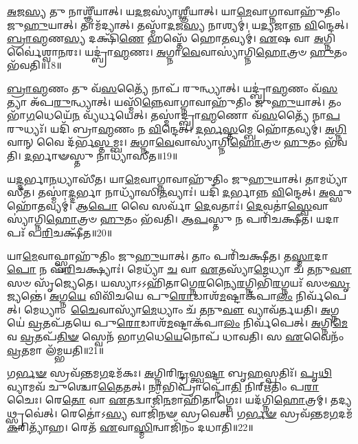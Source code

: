 \-\ul{𑌅}\-𑌜\-\ul{𑌸𑍍𑌯} 𑌤𑍁 𑌨𑌾𑌶𑍍𑌞𑍀᳴𑌯𑌾𑌤𑍍।
𑌯\-\ul{𑌦}\-𑌜𑌸𑍍𑌯𑌾॑\-\ul{𑌶𑍍𑌞𑍀}\-𑌯𑌾𑌤𑍍।
𑌯𑌾\-\ul{𑌮𑍇}\-𑌵𑌾𑌗𑍍𑌨𑌾𑌵𑌾𑌹𑍁᳴𑌤𑌿𑌂 𑌜𑍁\-\ul{𑌹𑍁}\-𑌯𑌾𑌤𑍍।
𑌤𑌾𑌮᳴𑌦𑍍𑌯𑌾𑌤𑍍।
𑌤𑌸𑍍𑌮𑌾᳴\-\ul{𑌦}\-𑌜\-\ul{𑌸𑍍𑌯} 𑌨𑌾𑌶𑍍𑌯𑌮𑍍॑।
𑌯\-\ul{𑌦𑍍𑌯}\-𑌜𑌾𑌨𑍍𑌨 \ul{𑌵𑌿}\-𑌨𑍍𑌦𑍇𑌤𑍍।
\-\ul{𑌬𑍍𑌰𑌾}\-\-\ul{𑌹𑍍𑌮}\-𑌣\-\ul{𑌸𑍍𑌯} 𑌦𑌕𑍍𑌷𑌿᳴\-\ul{𑌣𑍇} 𑌹𑌸𑍍𑌤𑍇᳴ 𑌹𑍋\-\ul{𑌤}\-𑌵𑍍𑌯𑌮𑍍॑।
\-\ul{𑌏}\-𑌷 𑌵𑌾 \ul{𑌅}\-𑌗𑍍𑌨𑌿𑌰𑍍𑌵𑍈॑𑌶𑍍𑌵𑌾\-\ul{𑌨}\-𑌰𑌃।
𑌯𑌦𑍍𑌬𑍍𑌰𑌾॑\-\ul{𑌹𑍍𑌮}\-𑌣𑌃।
\-\ul{𑌅}\-𑌗𑍍𑌨𑌾\-\ul{𑌵𑍇}\-𑌵𑌾𑌸𑍍𑌯𑌾॑𑌗𑍍𑌨𑌿\-\ul{𑌹𑍋}\-𑌤𑍍𑌰𑍞 \ul{𑌹𑍁}\-𑌤𑌂 𑌭᳴𑌵𑌤𑌿॥18॥

\-\ul{𑌬𑍍𑌰𑌾}\-\-\ul{𑌹𑍍𑌮}\-𑌣𑌂 𑌤𑍁 𑌵᳴\-\ul{𑌸}\-𑌤𑍍𑌯𑍈᳴ 𑌨𑌾𑌪᳴ 𑌰𑍁𑌨𑍍𑌧𑍍𑌯𑌾𑌤𑍍।
𑌯𑌦𑍍𑌬𑍍𑌰𑌾॑\-\ul{𑌹𑍍𑌮}\-𑌣𑌂 𑌵᳴\-\ul{𑌸}\-𑌤𑍍𑌯𑌾 𑌅᳴𑌪\-\ul{𑌰𑍁}\-𑌨𑍍𑌧𑍍𑌯𑌾𑌤𑍍।
𑌯𑌸𑍍𑌮𑌿᳴\-\ul{𑌨𑍍𑌨𑍇}\-𑌵𑌾𑌗𑍍𑌨𑌾𑌵𑌾𑌹𑍁᳴𑌤𑌿𑌂 𑌜𑍁\-\ul{𑌹𑍁}\-𑌯𑌾𑌤𑍍।
𑌤𑌂 𑌭𑌾᳴\-\ul{𑌗}\-𑌧𑍇𑌯𑍇᳴\-\ul{𑌨} 𑌵𑍍𑌯᳴𑌰𑍍𑌧𑌯𑍇𑌤𑍍।
𑌤𑌸𑍍𑌮𑌾॑𑌦𑍍𑌬𑍍𑌰𑌾\-\ul{𑌹𑍍𑌮}\-𑌣𑍋 𑌵᳴\-\ul{𑌸}\-𑌤𑍍𑌯𑍈᳴ 𑌨𑌾\-\ul{𑌪}\-𑌰𑍁𑌧𑍍𑌯𑌃᳴।
𑌯𑌦𑌿᳴ 𑌬𑍍𑌰𑌾\-\ul{𑌹𑍍𑌮}\-𑌣𑌂 𑌨 \ul{𑌵𑌿}\-𑌨𑍍𑌦𑍇𑌤𑍍।
\-\ul{𑌦}\-\-\ul{𑌰𑍍𑌭}\-\-\ul{𑌸𑍍𑌤}\-𑌮𑍍𑌬𑍇 𑌹𑍋᳴\-\ul{𑌤}\-𑌵𑍍𑌯𑌮𑍍॑।
\-\ul{𑌅}\-\-\ul{𑌗𑍍𑌨𑌿}\-𑌵𑌾𑌨𑍍 𑌵𑍈 𑌦᳴𑌰𑍍𑌭\-\ul{𑌸𑍍𑌤}\-𑌮𑍍𑌬𑌃।
\-\ul{𑌅}\-𑌗𑍍𑌨𑌾\-\ul{𑌵𑍇}\-𑌵𑌾𑌸𑍍𑌯𑌾॑𑌗𑍍𑌨𑌿\-\ul{𑌹𑍋}\-𑌤𑍍𑌰𑍞 \ul{𑌹𑍁}\-𑌤𑌂 𑌭᳴𑌵𑌤𑌿।
\-\ul{𑌦}\-𑌰𑍍𑌭𑌾𑍟𑌸𑍍𑌤𑍁 𑌨𑌾𑌧𑍍𑌯𑌾᳴𑌸𑍀𑌤॥19॥

𑌯\-\ul{𑌦𑍍𑌦}\-𑌰𑍍𑌭𑌾\-\ul{𑌨}\-𑌧𑍍𑌯𑌾𑌸𑍀᳴𑌤।
𑌯𑌾\-\ul{𑌮𑍇}\-𑌵𑌾𑌗𑍍𑌨𑌾𑌵𑌾𑌹𑍁᳴𑌤𑌿𑌂 𑌜𑍁\-\ul{𑌹𑍁}\-𑌯𑌾𑌤𑍍।
𑌤𑌾𑌮𑌧𑍍𑌯𑌾᳴𑌸𑍀𑌤।
𑌤𑌸𑍍𑌮𑌾॑\-\ul{𑌦𑍍𑌦}\-𑌰𑍍𑌭𑌾 𑌨𑌾𑌧𑍍𑌯𑌾᳴𑌸𑌿\-\ul{𑌤}\-𑌵𑍍𑌯𑌾𑌃॑।
𑌯𑌦𑌿᳴ \ul{𑌦}\-𑌰𑍍𑌭𑌾𑌨𑍍𑌨 \ul{𑌵𑌿}\-𑌨𑍍𑌦𑍇𑌤𑍍।
\-\ul{𑌅}\-𑌫𑍍𑌸𑍁 𑌹𑍋᳴\-\ul{𑌤}\-𑌵𑍍𑌯𑌮𑍍॑।
𑌆\-\ul{𑌪𑍋} 𑌵𑍈 𑌸𑌰𑍍𑌵𑌾᳴ \ul{𑌦𑍇}\-𑌵𑌤𑌾𑌃॑।
\-\ul{𑌦𑍇}\-𑌵𑌤𑌾॑\-\ul{𑌸𑍍𑌵𑍇}\-𑌵𑌾𑌸𑍍𑌯𑌾॑𑌗𑍍𑌨𑌿\-\ul{𑌹𑍋}\-𑌤𑍍𑌰𑍞 \ul{𑌹𑍁}\-𑌤𑌂 𑌭᳴𑌵𑌤𑌿।
𑌆\-\ul{𑌪}\-𑌸𑍍𑌤𑍁 𑌨 𑌪𑌰𑌿᳴𑌚𑌕𑍍𑌷𑍀𑌤।
𑌯𑌦𑌾𑌪𑌃᳴ 𑌪\-\ul{𑌰𑌿}\-𑌚𑌕𑍍𑌷𑍀᳴𑌤॥20॥

𑌯𑌾\-\ul{𑌮𑍇}\-𑌵𑌾𑌫𑍍𑌸𑍍𑌵𑌾𑌹𑍁᳴𑌤𑌿𑌂 𑌜𑍁\-\ul{𑌹𑍁}\-𑌯𑌾𑌤𑍍।
𑌤𑌾𑌂 𑌪𑌰𑌿᳴𑌚𑌕𑍍𑌷𑍀𑌤।
𑌤\-\ul{𑌸𑍍𑌮𑌾}\-𑌦𑌾\-\ul{𑌪𑍋} 𑌨 𑌪᳴\-\ul{𑌰𑌿}\-𑌚𑌕𑍍𑌷𑍍𑌯𑌾𑌃॑।
𑌮𑍇𑌧𑍍𑌯𑌾᳴ \ul{𑌚} 𑌵𑌾 \ul{𑌏}\-𑌤𑌸𑍍𑌯𑌾᳴\-\ul{𑌮𑍇}\-𑌧𑍍𑌯𑌾 𑌚᳴ \ul{𑌤}\-𑌨𑍁\-\ul{𑌵𑍗} 𑌸𑍞 𑌸𑍃᳴𑌜𑍍𑌯𑍇𑌤𑍇।
𑌯𑌸𑍍𑌯𑌾𑌽𑌽𑌹𑌿᳴𑌤𑌾𑌗𑍍𑌨𑍇\-\ul{𑌰}\-𑌨𑍍𑌯𑍈\-\ul{𑌰}\-𑌗𑍍𑌨𑌿𑌭𑌿᳴\-\ul{𑌰}\-𑌗𑍍𑌨𑌯𑌃᳴ 𑌸𑍞\-\ul{𑌸𑍃}\-𑌜𑍍𑌯𑌨𑍍𑌤𑍇॑।
\-\ul{𑌅}\-𑌗𑍍𑌨\-\ul{𑌯𑍇} 𑌵𑌿𑌵𑌿᳴𑌚𑌯𑍇 𑌪𑍁\-\ul{𑌰𑍋}\-𑌡𑌾𑌶᳴\-\ul{𑌮}\-𑌷𑍍𑌟𑌾\-𑌕᳴𑌪𑌾\-\ul{𑌲𑌂} 𑌨𑌿𑌰𑍍𑌵᳴𑌪𑍇𑌤𑍍।
𑌮𑍇𑌧𑍍𑌯𑌾𑌂 \ul{𑌚𑍈}\-𑌵𑌾𑌸𑍍𑌯𑌾᳴\-\ul{𑌮𑍇}\-𑌧𑍍𑌯𑌾𑌂 𑌚᳴ \ul{𑌤}\-𑌨𑍁\-\ul{𑌵𑍗} 𑌵𑍍𑌯𑌾𑌵᳴𑌰𑍍𑌤𑌯𑌤𑌿।
\-\ul{𑌅}\-𑌗𑍍𑌨𑌯𑍇॑ \ul{𑌵𑍍𑌰}\-𑌤𑌪᳴𑌤𑌯𑍇 𑌪𑍁\-\ul{𑌰𑍋}\-𑌡𑌾𑌶᳴\-\ul{𑌮}\-𑌷𑍍𑌟𑌾\-𑌕᳴𑌪𑌾\-\ul{𑌲𑌂} 𑌨𑌿𑌰𑍍𑌵᳴𑌪𑍇𑌤𑍍।
\-\ul{𑌅}\-𑌗𑍍𑌨𑌿\-\ul{𑌮𑍇}\-𑌵 \ul{𑌵𑍍𑌰}\-𑌤𑌪᳴\-\ul{𑌤𑌿}\-\-\ul{𑍟} 𑌸𑍍𑌵𑍇𑌨᳴ 𑌭𑌾\-\ul{𑌗}\-𑌧𑍇\-\ul{𑌯𑍇}\-𑌨𑍋𑌪᳴ 𑌧𑌾𑌵𑌤𑌿।
𑌸 \ul{𑌏}\-𑌵𑍈𑌨𑌂᳴ \ul{𑌵𑍍𑌰}\-𑌤𑌮𑌾 𑌲᳴𑌮𑍍𑌭𑌯𑌤𑌿॥21॥

𑌗\-\ul{𑌰𑍍𑌭}\-\-\ul{𑍟} 𑌸𑍍𑌰𑌵᳴𑌨𑍍𑌤𑌮\-\ul{𑌗}\-𑌦𑌮᳴𑌕𑌃।
\-\ul{𑌅}\-𑌗𑍍𑌨𑌿𑌰𑌿\-\ul{𑌨𑍍𑌦𑍍𑌰}\-𑌸𑍍𑌤𑍍𑌵\-\ul{𑌷𑍍𑌟𑌾} 𑌬𑍃\-\ul{𑌹}\-𑌸𑍍𑌪𑌤𑌿𑌃᳴।
\-\ul{𑌪𑍃}\-\-\ul{𑌥𑌿}\-𑌵𑍍𑌯𑌾𑌮𑌵᳴ 𑌚𑍁𑌶𑍍𑌚𑍋\-\ul{𑌤𑍈}\-𑌤𑌤𑍍।
𑌨𑌾𑌭𑌿𑌪𑍍𑌰𑌾𑌪𑍍𑌨𑍋᳴\-\ul{𑌤𑌿} 𑌨𑌿𑌰𑍍‌\mbox{}𑌋᳴𑌤𑌿𑌂 𑌪\-\ul{𑌰𑌾}\-𑌚𑍈𑌃।
𑌰𑍇\-\ul{𑌤𑍋} 𑌵𑌾 \ul{𑌏}\-𑌤𑌦𑍍𑌵𑌾𑌜𑌿᳴\-\ul{𑌨}\-𑌮𑌾𑌹𑌿᳴𑌤𑌾𑌗𑍍𑌨𑍇𑌃।
𑌯𑌦᳴𑌗𑍍𑌨𑌿\-\ul{𑌹𑍋}\-𑌤𑍍𑌰𑌮𑍍।
𑌤𑌦𑍍𑌯𑌥𑍍𑌸𑍍𑌰𑌵𑍇॑𑌤𑍍।
𑌰𑍇𑌤𑍋॑\-𑌽\-\ul{𑌸𑍍𑌯} 𑌵𑌾𑌜𑌿᳴𑌨𑍟 𑌸𑍍𑌰𑌵𑍇𑌤𑍍।
𑌗\-\ul{𑌰𑍍𑌭}\-\-\ul{𑍟} 𑌸𑍍𑌰𑌵᳴𑌨𑍍𑌤𑌮\-\ul{𑌗}\-𑌦𑌮᳴\-\ul{𑌕}\-𑌰𑌿𑌤𑍍𑌯𑌾᳴𑌹।
𑌰𑍇𑌤᳴ \ul{𑌏}\-𑌵𑌾\-\ul{𑌸𑍍𑌮𑌿}\-𑌨𑍍𑌵𑌾𑌜𑌿᳴𑌨𑌂 𑌦𑌧𑌾𑌤𑌿॥22॥

